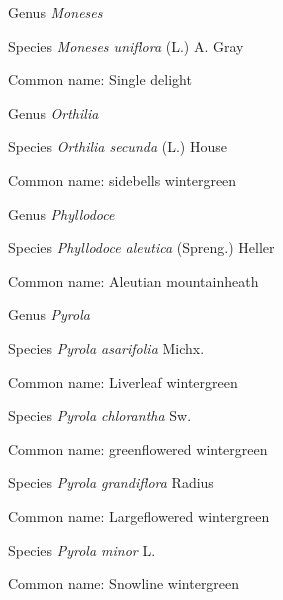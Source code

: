 \documentclass[9pt, article]{memoir}
\begin{document}
\begin{multicols}{2}
\vspace{6pt}\noindent\hspace{30pt}Genus \textit{Moneses}


\vspace{6pt}\noindent\hspace{36pt}Species \textit{Moneses uniflora} (L.) A. Gray


Common name: Single delight

\vspace{6pt}\noindent\hspace{30pt}Genus \textit{Orthilia}


\vspace{6pt}\noindent\hspace{36pt}Species \textit{Orthilia secunda} (L.) House


Common name: sidebells wintergreen

\vspace{6pt}\noindent\hspace{30pt}Genus \textit{Phyllodoce}


\vspace{6pt}\noindent\hspace{36pt}Species \textit{Phyllodoce aleutica} (Spreng.) Heller


Common name: Aleutian mountainheath

\vspace{6pt}\noindent\hspace{30pt}Genus \textit{Pyrola}


\vspace{6pt}\noindent\hspace{36pt}Species \textit{Pyrola asarifolia} Michx.


Common name: Liverleaf wintergreen

\vspace{6pt}\noindent\hspace{36pt}Species \textit{Pyrola chlorantha} Sw.


Common name: greenflowered wintergreen

\vspace{6pt}\noindent\hspace{36pt}Species \textit{Pyrola grandiflora} Radius


Common name: Largeflowered wintergreen

\vspace{6pt}\noindent\hspace{36pt}Species \textit{Pyrola minor} L.


Common name: Snowline wintergreen


\end{multicols}
\end{document}
